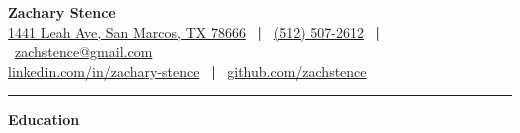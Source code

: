 \documentclass[10pt]{article}
\newlength{\headingborderwidth}
\newcommand{\sep}{\ \textbf{|} \ }
\newcommand{\resheading}[1]{
    \begin{mdframed}[
        backgroundcolor=black!15,
        linewidth=\headingborderwidth,
        innertopmargin=4pt,
        innerbottommargin=4pt,
        skipabove=6pt,
        skipbelow=2pt]
        \textbf{\large #1}
    \end{mdframed}
}
\begin{document}
\begin{NoHyper}

%
%

\textbf{\huge Zachary Stence} \\[2pt]
\href{https://goo.gl/maps/5kUt8MF8fhMqY8UM9}{1441 Leah Ave, San Marcos, TX 78666} \sep    \href{tel:15125072612}{(512) 507-2612} \sep \href{mailto:zachstence@gmail.com}{zachstence@gmail.com} \\
\href{https://www.linkedin.com/in/zachary-stence}{linkedin.com/in/zachary-stence} \sep  \href{https://www.github.com/zachstence}{github.com/zachstence} \\[6pt]

\hrule
\vspace{2pt}

%
%

\resheading{Education}


\end{NoHyper}
\end{document}
